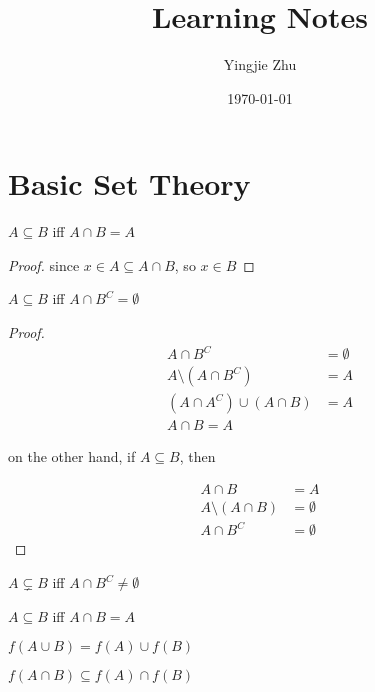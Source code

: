 \documentclass[11pt,a4paper]{article}
\title{Learning Notes}
\author{Yingjie Zhu}
\date{\today}
\begin{document}
\maketitle

\section{Basic Set Theory}

\begin{lem}
    $A \subseteq B$ iff $A \cap B = A$
\end{lem}

\begin{proof}
    since $x \in A \subseteq A \cap B$, so $x \in B$
\end{proof}

\begin{lem}
    $A \subseteq B$ iff $A \cap B^C = \emptyset$
\end{lem}

\begin{proof}
    \begin{align*}
        A \cap B^C &= \emptyset \\
        A \setminus \left(A \cap B^C\right) &= A \\
        \left( A \cap A^C \right) \cup \left( A \cap B \right) &= A \\
        A \cap B = A 
    \end{align*}

    on the other hand, if $A \subseteq B$, then

    \begin{align*}
        A \cap B  &= A \\
        A \setminus \left(A \cap B \right) &= \emptyset \\
        A \cap B^C &= \emptyset
    \end{align*}
\end{proof}

\begin{lem}
    $A \subsetneq B$ iff $A \cap B^C \ne \emptyset$
\end{lem}

\begin{lem}
    $A \subseteq B$ iff $A \cap B = A$
\end{lem}

\begin{lem}
    $f(A \cup B) = f(A) \cup f(B)$
\end{lem}


\begin{lem}
    $f(A \cap B) \subseteq f(A) \cap f(B)$
\end{lem}
\end{document}
